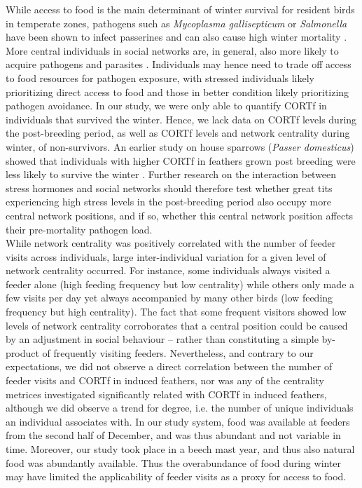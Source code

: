 \documentclass[10pt, twoside]{book} %
\begin{document}
While access to food is the main determinant of winter survival for resident birds in temperate zones, pathogens such as \textit{Mycoplasma gallisepticum} or \textit{Salmonella} have been shown to infect passerines and can also cause high winter mortality \citep{Robb2008}. More central individuals in social networks are, in general, also more likely to acquire pathogens and parasites \citep{Godfrey2009, Bull2012}. Individuals may hence need to trade off access to food resources for pathogen exposure, with stressed individuals likely prioritizing direct access to food and those in better condition likely prioritizing pathogen avoidance. In our study, we were only able to quantify CORTf in individuals that survived the winter. Hence, we lack data on CORTf levels during the post-breeding period, as well as CORTf levels and network centrality during winter, of non-survivors. An earlier study on house sparrows (\textit{Passer domesticus}) showed that individuals with higher CORTf in feathers grown post breeding were less likely to survive the winter \citep{Koren2012}. Further research on the interaction between stress hormones and social networks should therefore test whether great tits experiencing high stress levels in the post-breeding period also occupy more central network positions, and if so, whether this central network position affects their pre-mortality pathogen load.\\

While network centrality was positively correlated with the number of feeder visits across individuals, large inter-individual variation for a given level of network centrality occurred. For instance, some individuals always visited a feeder alone (high feeding frequency but low centrality) while others only made a few visits per day yet always accompanied by many other birds (low feeding frequency but high centrality). The fact that some frequent visitors showed low levels of network centrality corroborates that a central position could be caused by an adjustment in social behaviour -- rather than constituting a simple by-product of frequently visiting feeders. Nevertheless, and contrary to our expectations, we did not observe a direct correlation between the number of feeder visits and CORTf in induced feathers, nor was any of the centrality metrices investigated significantly related with CORTf in induced feathers, although we did observe a trend for degree, i.e. the number of unique individuals an individual associates with. In our study system, food was available at feeders from the second half of December, and was thus abundant and not variable in time. Moreover, our study took place in a beech mast year, and thus also natural food was abundantly available. Thus the overabundance of food during winter may have limited the applicability of feeder visits as a proxy for access to food.\\
\end{document}
